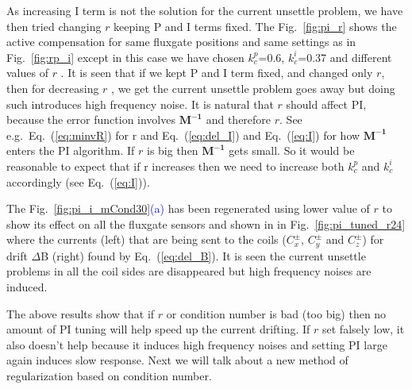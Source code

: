  
As increasing I term is not the solution for the current unsettle problem, we have then tried changing $r$ keeping P and I terms fixed. The Fig.~\ref{fig:pi_r} shows the active compensation for same fluxgate positions and same settings as in Fig.~\ref{fig:rp_i} except in this case we have chosen $k_c^p$=0.6, $k_c^i$=0.37 and different values of $r$ . It is seen that if we kept P and I term fixed, and changed only $r$, then for decreasing $r$ , we get the current unsettle problem goes away but doing such introduces high frequency noise. It is natural that $r$ should affect PI, because the error function involves $\mathbf{M^{-1}}$ and therefore $r$.  See e.g.~Eq.~(\ref{eq:minvR}) for r and Eq.~(\ref{eq:del_I}) and Eq.~(\ref{eq:I}) for how $\mathbf{M^{-1}}$ enters the PI algorithm.  If $r$ is big then $\mathbf{M^{-1}}$ gets small.  So it would be reasonable to expect that if r increases then we need to increase both $k_c^p$ and $k_c^i$ accordingly (see Eq.~(\ref{eq:I})).






The Fig.~\ref{fig:pi_i_mCond30}\textcolor{blue}{(a)} has been regenerated using lower value of $r$ to show its effect on all the fluxgate sensors and shown in in Fig.~\ref{fig:pi_tuned_r24} where the currents (left) that are being sent to the coils ($C_x^\pm$, $C_y^\pm$ and $C_z^\pm$) for drift $\Delta$B (right) found by Eq.~(\ref{eq:del_B}). It is seen the current unsettle problems in all the coil sides are disappeared but high frequency noises are induced.



 
 The above results show that if $r$ or condition number is bad (too big) then no amount of PI tuning will help speed up the current drifting.  If $r$ set falsely low, it also doesn't help because it induces high frequency noises and setting PI large again induces slow response. Next we will talk about a new method of regularization based on condition number.
 



